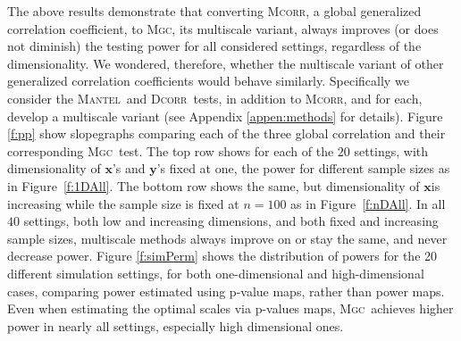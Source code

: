 \documentclass[11pt]{article}
\providecommand{\sct}[1]{{\normalfont\textsc{#1}}}
\providecommand{\mb}[1]{\boldsymbol{#1}}
\newcommand{\Mgc}{\sct{Mgc}}
\newcommand{\Hhg}{\sct{Hhg}}
\newcommand{\Dcorr}{\sct{Dcorr}}
\newcommand{\Mcorr}{\sct{Mcorr}}
\newcommand{\Mantel}{\sct{Mantel}}
\newcommand{\mbx}{\ensuremath{\mb{x}}}
\newcommand{\mby}{\ensuremath{\mb{y}}}
\begin{document}
The above results demonstrate that converting \Mcorr, a global generalized correlation coefficient, to \Mgc, its multiscale variant, always improves (or does not diminish) the testing power for all considered settings, regardless of the dimensionality.  We wondered, therefore, whether the multiscale variant of other generalized correlation coefficients would behave similarly.  Specifically we consider the \Mantel~and \Dcorr~tests, in addition to \Mcorr, and for each, develop a multiscale variant (see Appendix \ref{appen:methods} for details). 
% 
Figure \ref{f:pp} show slopegraphs comparing each of the three global correlation and their corresponding \Mgc~test.  The top row shows for each of the $20$ settings, with dimensionality of \mbx's and \mby's  fixed at one, the  power for different sample sizes as in Figure~\ref{f:1DAll}.  The bottom row shows the same, but   dimensionality of \mbx is increasing while the sample size is fixed at $n=100$ as in Figure~\ref{f:nDAll}.  In all $40$ settings, both low and increasing dimensions, and both fixed and increasing sample sizes, multiscale methods always improve on or stay the same, and never decrease power. 
Figure \ref{f:simPerm} shows the distribution of powers for the 20 different simulation settings, for both one-dimensional and high-dimensional cases, comparing power estimated using p-value maps, rather than power maps.  
Even when estimating the optimal scales via p-values maps, \Mgc~achieves higher power in nearly all settings, especially high dimensional ones.
\end{document}
